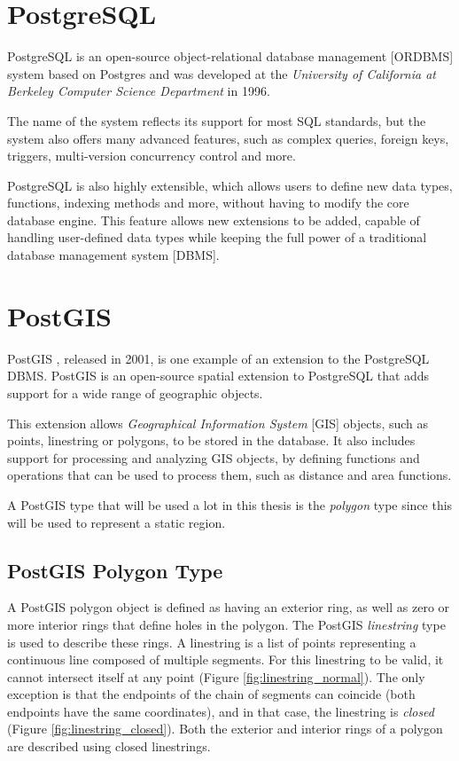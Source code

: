 
\section{PostgreSQL}
\label{section:postgresql}

PostgreSQL \cite{postgresql} is an open-source object-relational database management [ORDBMS] system based on Postgres and was developed at the \textit{University of California at  Berkeley Computer Science Department} in 1996.

The name of the system reflects its support for most SQL standards, but the system also offers many advanced features, such as complex queries, foreign keys, triggers, multi-version concurrency control and more. 

PostgreSQL is also highly extensible, which allows users to define new data types, functions, indexing methods and more, without having to modify the core database engine. This feature allows new extensions to be added, capable of handling user-defined data types while keeping the full power of a traditional database management system [DBMS].

\section{PostGIS}
\label{section:postgis}

PostGIS \cite{postgis}, released in 2001, is one example of an extension to the PostgreSQL DBMS. PostGIS is an open-source spatial extension to PostgreSQL that adds support for a wide range of geographic objects. 

This extension allows \textit{Geographical Information System} [GIS] objects, such as points, linestring or polygons, to be stored in the database. It also includes support for processing and analyzing GIS objects, by defining functions and operations that can be used to process them, such as distance and area functions.

A PostGIS type that will be used a lot in this thesis is the \textit{polygon} type since this will be used to represent a static region. 

\subsection{PostGIS Polygon Type}
\label{section:postgis_polygon}

A PostGIS polygon object is defined as having an exterior ring, as well as zero or more interior rings that define holes in the polygon. The PostGIS \textit{linestring} type is used to describe these rings. A linestring
is a list of points representing a continuous line composed of multiple segments. For this linestring to be valid, it cannot intersect itself at any point (Figure \ref{fig:linestring_normal}). The only exception is that the endpoints of the chain of segments can coincide (both endpoints have the same coordinates), and in that case, the linestring is \textit{closed} (Figure \ref{fig:linestring_closed}). Both the exterior and interior rings of a polygon are described using closed linestrings.

